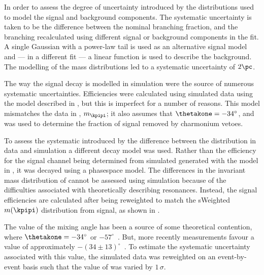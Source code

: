In order to assess the degree of uncertainty introduced by the distributions used to model the
signal and background components.
The systematic uncertainty is taken to be the difference between the nominal branching fraction,
and the branching recalculated using different signal or background components in the fit.
A single Gaussian with a power-law tail is used as an alternative signal model and --- in a
different fit --- a linear function is used to describe the background.
The modelling of the mass distributions led to a systematic uncertainty of $2\pc$.

The way the signal decay is modelled in simulation were the source of numerous systematic
uncertainties.
Efficiencies were calculated using simulated data using the model described in
, but this is imperfect for a number of reasons.
This model mismatches the data in \qsq, $m_\kpipi$; it also assumes that $\thetakone=-34^\circ$,
and was used to determine the fraction of signal removed by charmonium vetoes.

To assess the systematic introduced by the difference between the \qsq distribution in data and
simulation a different decay model was used.
Rather than the efficiency for the signal channel being determined from simulated
 generated with the model in , it was decayed
using a phasespace model.
The differences in the invariant mass distribution of \kpipi cannot be assessed using simulation
because of the difficulties associated with theoretically describing \kpipi resonances.
Instead, the signal efficiencies are calculated after being reweighted to match the sWeighted
$m(\kpipi)$ distribution from signal, as shown in .

The value of the mixing angle \thetakone has been a source of some theoretical contention, where
$\thetakone=-34^\circ$ or
$-57^\circ$~\cite{PhysRevD.47.1252,Tayduganov:2011ui,Hatanaka:2008xj,Cheng:2011pb,Divotgey:2013jba,Cheng:2013cwa}.
But, more recently measurements favour a value of approximately
$-(34\pm13)^\circ$~\cite{Hatanaka:2008xj,Cheng:2011pb,Divotgey:2013jba,Cheng:2013cwa}.
To estimate the systematic uncertainty associated with this value, the simulated data was
reweighted on an event-by-event basis such that the value of \thetakone was varied by $1\,\sigma$.


